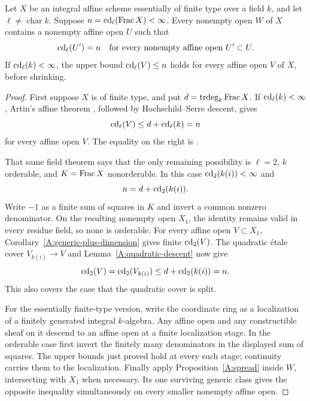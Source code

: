 \begin{theorem}
\label{A:eventual-field}
Let $X$ be an integral affine scheme essentially of finite type over a field $k$, and let $\ell\neq\operatorname{char}k$. Suppose $n=\operatorname{cd}_\ell(\operatorname{Frac} X)<\infty$. Every nonempty open $W$ of $X$ contains a nonempty affine open $U$ such that
\[
 \operatorname{cd}_\ell(U')=n
 \quad\hbox{for every nonempty affine open }U'\subset U.
\]
If $\operatorname{cd}_\ell(k)<\infty$, the upper bound $\operatorname{cd}_\ell(V)\leq n$ holds for every affine open $V$ of $X$, before shrinking.
\end{theorem}
\begin{proof}
First suppose $X$ is of finite type, and put $d=\operatorname{trdeg}_k\operatorname{Frac} X$. If $\operatorname{cd}_\ell(k)<\infty$, Artin's affine theorem \citep[Exposé XIV, Corollaire 3.2]{A_SGA4}, followed by Hochschild--Serre descent, gives
\[
 \operatorname{cd}_\ell(V)\leq d+\operatorname{cd}_\ell(k)=n
\]
for every affine open $V$. The equality on the right is \citet[Exposé X, Théorème 2.1]{A_SGA4}.

That same field theorem says that the only remaining possibility is $\ell=2$, $k$ orderable, and $K=\operatorname{Frac} X$ nonorderable. In this case $\operatorname{cd}_2(k(i))<\infty$ and
\[
 n=d+\operatorname{cd}_2(k(i)).
\]
Write $-1$ as a finite sum of squares in $K$ and invert a common nonzero denominator. On the resulting nonempty open $X_1$, the identity remains valid in every residue field, so none is orderable. For every affine open $V\subset X_1$, Corollary~\ref{A:generic-plus-dimension} gives finite $\operatorname{cd}_2(V)$. The quadratic étale cover $V_{k(i)}\to V$ and Lemma~\ref{A:quadratic-descent} now give
\[
 \operatorname{cd}_2(V)=\operatorname{cd}_2(V_{k(i)})\leq d+\operatorname{cd}_2(k(i))=n.
\]
This also covers the case that the quadratic cover is split.

For the essentially finite-type version, write the coordinate ring as a localization of a finitely generated integral $k$-algebra. Any affine open and any constructible sheaf on it descend to an affine open at a finite localization stage. In the orderable case first invert the finitely many denominators in the displayed sum of squares. The upper bounds just proved hold at every such stage; continuity \citep[Exposé VII, Théorème 5.7]{A_SGA4} carries them to the localization. Finally apply Proposition~\ref{A:spread} inside $W$, intersecting with $X_1$ when necessary. Its one surviving generic class gives the opposite inequality simultaneously on every smaller nonempty affine open.
\end{proof}

